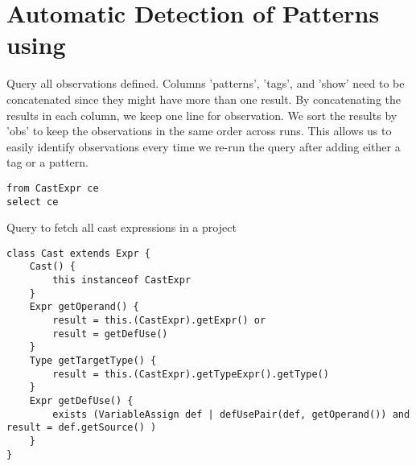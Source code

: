 \chapter{Automatic Detection of Patterns using \ql{}}\label{ap:ql}

Query all observations defined.
Columns 'patterns', 'tags', and 'show' need to be concatenated since they might have more than one result.
By concatenating the results in each column, we keep one line for observation.
We sort the results by 'obs' to keep the observations in the same order across runs.
This allows us to easily identify observations every time we re-run the query after adding either a tag or a pattern.

\begin{listing}
\begin{verbatim}
from CastExpr ce
select ce
\end{verbatim}
\caption{Query to fetch all cast expressions in a project}
\end{listing}

\begin{listing}
\begin{verbatim}
class Cast extends Expr {
	Cast() {
		this instanceof CastExpr
	}
	Expr getOperand() {
		result = this.(CastExpr).getExpr() or
		result = getDefUse()
	}
	Type getTargetType() {
		result = this.(CastExpr).getTypeExpr().getType()
	}
	Expr getDefUse() {
		exists (VariableAssign def | defUsePair(def, getOperand()) and result = def.getSource() )
	}
}
\end{verbatim}
\end{listing}
